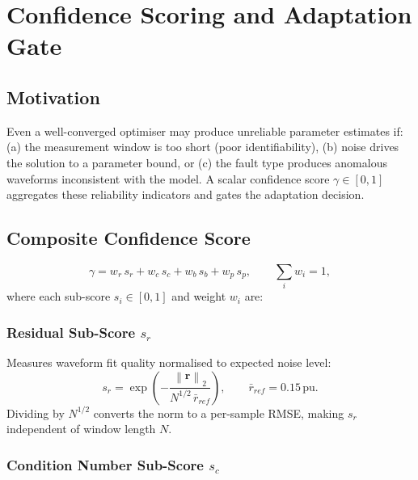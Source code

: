 \documentclass[12pt, a4paper]{article}
\theoremstyle{definition}
\theoremstyle{plain}
\newcommand{\vect}[1]{\bm{#1}}
\newcommand{\norm}[1]{\left\|#1\right\|}
\newcommand{\pu}{\,\text{pu}}
\begin{document}
\section{Confidence Scoring and Adaptation Gate}
\label{sec:confidence}

\subsection{Motivation}
\label{sec:confidence:motivation}

Even a well-converged optimiser may produce unreliable parameter estimates if:
(a) the measurement window is too short (poor identifiability),
(b) noise drives the solution to a parameter bound, or
(c) the fault type produces anomalous waveforms inconsistent with the model.
A scalar confidence score $\gamma \in [0, 1]$ aggregates these reliability
indicators and gates the adaptation decision.

\subsection{Composite Confidence Score}
\label{sec:confidence:score}

\begin{equation}
  \boxed{
  \gamma = w_r\,s_r + w_c\,s_c + w_b\,s_b + w_p\,s_p,
  \qquad \sum_{i} w_i = 1,}
  \label{eq:gamma}
\end{equation}
where each sub-score $s_i \in [0, 1]$ and weight $w_i$ are:

\subsubsection{Residual Sub-Score $s_r$}

Measures waveform fit quality normalised to expected noise level:
\begin{equation}
  s_r = \exp\!\left(-\frac{\norm{\vect{r}}_2}{N^{1/2}\,\bar{r}_{ref}}\right),
  \qquad \bar{r}_{ref} = 0.15\pu.
  \label{eq:sr}
\end{equation}
Dividing by $N^{1/2}$ converts the norm to a per-sample RMSE, making $s_r$
independent of window length $N$.

\subsubsection{Condition Number Sub-Score $s_c$}
\end{document}
